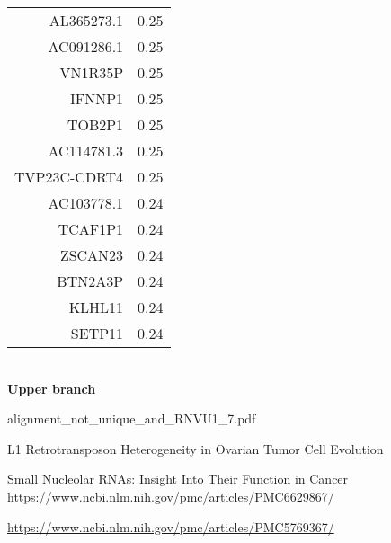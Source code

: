 \documentclass{article}
\begin{document}
\begin{center}
\begin{minipage}{.35\textwidth}
\begin{tabular}{rr}
  AL365273.1 & 0.25 \\ 
  AC091286.1 & 0.25 \\ 
  VN1R35P & 0.25 \\ 
  IFNNP1 & 0.25 \\ 
  TOB2P1 & 0.25 \\ 
  AC114781.3 & 0.25 \\ 
  TVP23C-CDRT4 & 0.25 \\ 
  AC103778.1 & 0.24 \\ 
  TCAF1P1 & 0.24 \\ 
  ZSCAN23 & 0.24 \\ 
  BTN2A3P & 0.24 \\ 
  KLHL11 & 0.24 \\ 
  SETP11 & 0.24 \\ 
   \hline
\end{tabular}
\\\textbf{Upper branch}
\end{minipage}
\end{center}

alignment_not_unique_and_RNVU1_7.pdf

L1 Retrotransposon Heterogeneity in Ovarian Tumor Cell Evolution

Small Nucleolar RNAs: Insight Into Their Function in Cancer \url{https://www.ncbi.nlm.nih.gov/pmc/articles/PMC6629867/}

\url{https://www.ncbi.nlm.nih.gov/pmc/articles/PMC5769367/}
\end{document}
